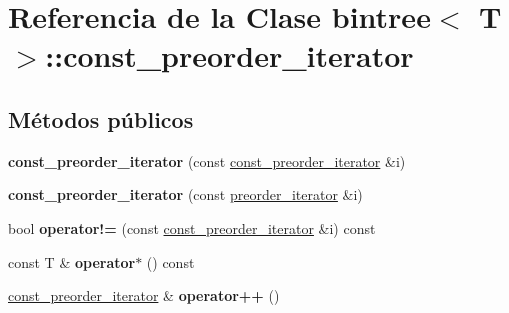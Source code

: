 \hypertarget{classbintree_1_1const__preorder__iterator}{}\section{Referencia de la Clase bintree$<$ T $>$\+:\+:const\+\_\+preorder\+\_\+iterator}
\label{classbintree_1_1const__preorder__iterator}
\subsection*{Métodos públicos}
\begin{DoxyCompactItemize}
\item 
\hypertarget{classbintree_1_1const__preorder__iterator_ad7e733eae6ff3c15876789e0a3ea5728}{}{\bfseries const\+\_\+preorder\+\_\+iterator} (const \hyperlink{classbintree_1_1const__preorder__iterator}{const\+\_\+preorder\+\_\+iterator} \&i)\label{classbintree_1_1const__preorder__iterator_ad7e733eae6ff3c15876789e0a3ea5728}

\item 
\hypertarget{classbintree_1_1const__preorder__iterator_af32632713d464a9fbfa6d7bebc7e4d05}{}{\bfseries const\+\_\+preorder\+\_\+iterator} (const \hyperlink{classbintree_1_1preorder__iterator}{preorder\+\_\+iterator} \&i)\label{classbintree_1_1const__preorder__iterator_af32632713d464a9fbfa6d7bebc7e4d05}

\item 
\hypertarget{classbintree_1_1const__preorder__iterator_a14451415df20b76c42f212ff62c8ba1b}{}bool {\bfseries operator!=} (const \hyperlink{classbintree_1_1const__preorder__iterator}{const\+\_\+preorder\+\_\+iterator} \&i) const \label{classbintree_1_1const__preorder__iterator_a14451415df20b76c42f212ff62c8ba1b}

\item 
\hypertarget{classbintree_1_1const__preorder__iterator_ab7d6e7ecc72ff63aaaf9219e7b7f930b}{}const T \& {\bfseries operator$\ast$} () const \label{classbintree_1_1const__preorder__iterator_ab7d6e7ecc72ff63aaaf9219e7b7f930b}

\item 
\hypertarget{classbintree_1_1const__preorder__iterator_af522a06205187003a8e96fca23b946fe}{}\hyperlink{classbintree_1_1const__preorder__iterator}{const\+\_\+preorder\+\_\+iterator} \& {\bfseries operator++} ()\label{classbintree_1_1const__preorder__iterator_af522a06205187003a8e96fca23b946fe}


\end{DoxyCompactItemize}
